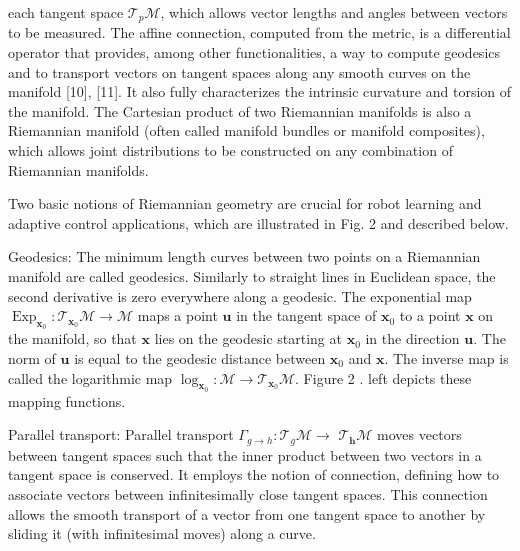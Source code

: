 \documentclass[10pt]{article}
\begin{document}
each tangent space $\mathcal{T}_{p} \mathcal{M}$, which allows vector lengths and angles between vectors to be measured. The affine connection, computed from the metric, is a differential operator that provides, among other functionalities, a way to compute geodesics and to transport vectors on tangent spaces along any smooth curves on the manifold [10], [11]. It also fully characterizes the intrinsic curvature and torsion of the manifold. The Cartesian product of two Riemannian manifolds is also a Riemannian manifold (often called manifold bundles or manifold composites), which allows joint distributions to be constructed on any combination of Riemannian manifolds.

Two basic notions of Riemannian geometry are crucial for robot learning and adaptive control applications, which are illustrated in Fig. 2 and described below.

Geodesics: The minimum length curves between two points on a Riemannian manifold are called geodesics. Similarly to straight lines in Euclidean space, the second derivative is zero everywhere along a geodesic. The exponential map $\operatorname{Exp}_{\boldsymbol{x}_{0}}: \mathcal{T}_{\boldsymbol{x}_{0}} \mathcal{M} \rightarrow \mathcal{M}$ maps a point $\boldsymbol{u}$ in the tangent space of $\boldsymbol{x}_{0}$ to a point $\boldsymbol{x}$ on the manifold, so that $\boldsymbol{x}$ lies on the geodesic starting at $\boldsymbol{x}_{0}$ in the direction $\boldsymbol{u}$. The norm of $\boldsymbol{u}$ is equal to the geodesic distance between $\boldsymbol{x}_{0}$ and $\boldsymbol{x}$. The inverse map is called the logarithmic map $\log _{\boldsymbol{x}_{0}}: \mathcal{M} \rightarrow \mathcal{T}_{\boldsymbol{x}_{0}} \mathcal{M}$. Figure 2 . left depicts these mapping functions.

Parallel transport: Parallel transport $\Gamma_{g \rightarrow h}: \mathcal{T}_{g} \mathcal{M} \rightarrow$ $\mathcal{T}_{\boldsymbol{h}} \mathcal{M}$ moves vectors between tangent spaces such that the inner product between two vectors in a tangent space is conserved. It employs the notion of connection, defining how to associate vectors between infinitesimally close tangent spaces. This connection allows the smooth transport of a vector from one tangent space to another by sliding it (with infinitesimal moves) along a curve.
\end{document}
